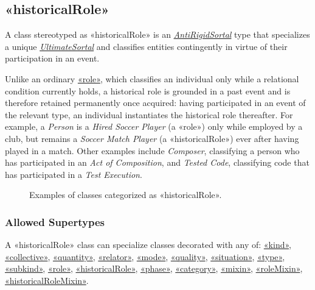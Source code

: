 \subsection{«historicalRole»}
\label{stereotype:historicalRole}

A class stereotyped as «historicalRole» is an \hyperref[stereotype:antiRigidSortal]{\textit{AntiRigidSortal}} type that specializes a unique \hyperref[stereotype:ultimateSortal]{\textit{UltimateSortal}} and classifies entities contingently in virtue of their participation in an event.

Unlike an ordinary \hyperref[stereotype:role]{«role»}, which classifies an individual only while a relational condition currently holds, a historical role is grounded in a past event and is therefore retained permanently once acquired: having participated in an event of the relevant type, an individual instantiates the historical role thereafter. For example, a \textit{Person} is a \textit{Hired Soccer Player} (a «role») only while employed by a club, but remains a \textit{Soccer Match Player} (a «historicalRole») ever after having played in a match. Other examples include \textit{Composer}, classifying a person who has participated in an \textit{Act of Composition}, and \textit{Tested Code}, classifying code that has participated in a \textit{Test Execution}.

\begin{figure}[h]
    \centering
    
    \caption{Examples of classes categorized as «historicalRole».}
    \label{fig:historicalRole-example}
\end{figure}

\subsubsection{Allowed Supertypes}

A «historicalRole» class can specialize classes decorated with any of: 
\hyperref[stereotype:kind]{«kind»}, \hyperref[stereotype:collective]{«collective»}, \hyperref[stereotype:quantity]{«quantity»}, \hyperref[stereotype:relator]{«relator»}, \hyperref[stereotype:mode]{«mode»}, \hyperref[stereotype:quality]{«quality»}, \hyperref[stereotype:situation]{«situation»}, \hyperref[stereotype:type]{«type»}, \hyperref[stereotype:subkind]{«subkind»}, \hyperref[stereotype:role]{«role»}, \hyperref[stereotype:historicalRole]{«historicalRole»}, \hyperref[stereotype:phase]{«phase»}, \hyperref[stereotype:category]{«category»}, \hyperref[stereotype:mixin]{«mixin»}, \hyperref[stereotype:roleMixin]{«roleMixin»}, \hyperref[stereotype:historicalRoleMixin]{«historicalRoleMixin»}.

